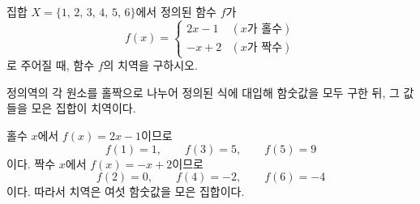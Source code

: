 \documentclass[10pt]{article}
\begin{document}
\newpage


\begin{dmproblem}
집합 $X = \{1,\, 2,\, 3,\, 4,\, 5,\, 6\}$에서 정의된 함수 $f$가
\begin{equation*}
  f(x) = \begin{cases} 2x - 1 & (x \text{가 홀수}) \\ -x + 2 & (x \text{가 짝수}) \end{cases}
\end{equation*}
로 주어질 때, 함수 $f$의 치역을 구하시오.
\end{dmproblem}

\begin{dmapproach}
정의역의 각 원소를 홀짝으로 나누어 정의된 식에 대입해 함숫값을 모두 구한 뒤, 그 값들을 모은 집합이 치역이다.
\end{dmapproach}

\begin{dmsolution}
홀수 $x$에서 $f(x) = 2x - 1$이므로
\begin{equation*}
  f(1) = 1,\qquad f(3) = 5,\qquad f(5) = 9
\end{equation*}
이다. 짝수 $x$에서 $f(x) = -x + 2$이므로
\begin{equation*}
  f(2) = 0,\qquad f(4) = -2,\qquad f(6) = -4
\end{equation*}
이다. 따라서 치역은 여섯 함숫값을 모은 집합이다.
\end{dmsolution}

\dmchecktitle



\newpage

\end{document}
